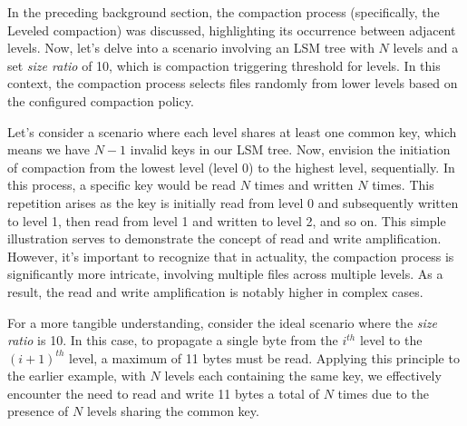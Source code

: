
In the preceding background section, the compaction process (specifically, the Leveled compaction) was discussed, 
highlighting its occurrence between adjacent levels. Now, let's delve into a scenario involving an LSM tree with $N$ 
levels and a set \textit{size ratio} of 10, which is compaction triggering threshold for levels. In this context, the compaction process selects files randomly from lower 
levels based on the configured compaction policy.

Let's consider a scenario where each level shares at least one common key, which means we have $N-1$ invalid keys in our 
LSM tree. Now, envision the 
initiation of compaction from the lowest level (level 0) to the highest level, sequentially. In this process, a 
specific key would be read $N$ times and written $N$ times. This repetition arises as the key is initially read from 
level 0 and subsequently written to level 1, then read from level 1 and written to level 2, and so on. This simple 
illustration serves to demonstrate the concept of read and write amplification. However, it's important to recognize 
that in actuality, the compaction process is significantly more intricate, involving multiple files across multiple 
levels. As a result, the read and write amplification is notably higher in complex cases.

For a more tangible understanding, consider the ideal scenario where the \textit{size ratio} is 10. In this case, to 
propagate a single byte from the $i^{th}$ level to the $(i+1)^{th}$ level, a maximum of 11 bytes must be read.
Applying this principle to the earlier example, with $N$ levels each containing the same key, we effectively encounter 
the need to read and write 11 bytes a total of $N$ times due to the presence of $N$ levels sharing the common key.